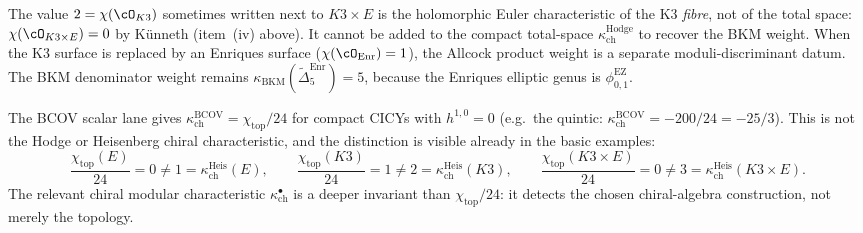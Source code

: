 \begin{remark}
\label{rem:kappa-cat-fiber-vs-total}
The value \(2=\chi(\cO_{K3})\) sometimes written next to \(K3\times E\) is the holomorphic Euler characteristic of the K3 \emph{fibre}, not of the total space: \(\chi(\cO_{K3\times E})=0\) by K\"unneth (item~(iv) above). It cannot be added to the compact total-space \(\kappa_{\mathrm{ch}}^{\mathrm{Hodge}}\) to recover the BKM weight. When the K3 surface is replaced by an Enriques surface (\(\chi(\cO_{\mathrm{Enr}})=1\)), the Allcock product weight is a separate moduli-discriminant datum. The BKM denominator weight remains
\(\kappa_{\mathrm{BKM}}(\widetilde\Delta^{\mathrm{Enr}}_5)=5\), because
the Enriques elliptic genus is \(\phi^{\mathrm{EZ}}_{0,1}\).
\end{remark}

\begin{remark}[Why \texorpdfstring{$\chi_{\mathrm{top}}/24 \neq \kappa_{\mathrm{ch}}$}{chi-top/24 != kappa-ch} in general]
\label{rem:chi-top-24-failure}
The BCOV scalar lane gives $\kappa_{\mathrm{ch}}^{\mathrm{BCOV}}=\chi_{\mathrm{top}}/24$ for compact CICYs with $h^{1,0}=0$ (e.g.\ the quintic: $\kappa_{\mathrm{ch}}^{\mathrm{BCOV}}=-200/24=-25/3$). This is not the Hodge or Heisenberg chiral characteristic, and the distinction is visible already in the basic examples:
\[
 \frac{\chi_{\mathrm{top}}(E)}{24} = 0 \neq 1 = \kappa_{\mathrm{ch}}^{\mathrm{Heis}}(E), \qquad
 \frac{\chi_{\mathrm{top}}(K3)}{24} = 1 \neq 2 = \kappa_{\mathrm{ch}}^{\mathrm{Heis}}(K3), \qquad
 \frac{\chi_{\mathrm{top}}(K3 \times E)}{24} = 0 \neq 3 = \kappa_{\mathrm{ch}}^{\mathrm{Heis}}(K3 \times E).
\]
The relevant chiral modular characteristic \(\kappa_{\mathrm{ch}}^\bullet\) is a deeper invariant than \(\chi_{\mathrm{top}}/24\): it detects the chosen chiral-algebra construction, not merely the topology.
\end{remark}


